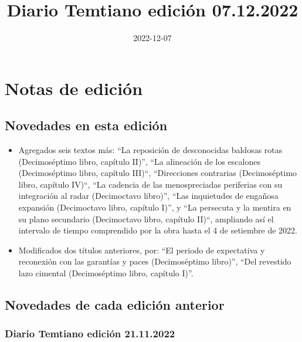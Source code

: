 \documentclass[
]{book}
\title{Diario Temtiano edición 07.12.2022}
\author{}
\date{\vspace{-2.5em}2022-12-07}
\begin{document}
\maketitle

{
\setcounter{tocdepth}{1}
\tableofcontents
}
\hypertarget{notas-de-ediciuxf3n}{%
\chapter*{Notas de edición}\label{notas-de-ediciuxf3n}}

\hypertarget{novedades-en-esta-ediciuxf3n}{%
\section*{Novedades en esta edición}\label{novedades-en-esta-ediciuxf3n}}

\begin{itemize}
\item
  Agregados seis textos más: ``La reposición de desconocidas baldosas rotas (Decimoséptimo libro, capítulo II)'', ``La alineación de los escalones (Decimoséptimo libro, capítulo III)``, ``Direcciones contrarias (Decimoséptimo libro, capítulo IV)``, ``La cadencia de las menospreciadas periferias con su integración al radar (Decimoctavo libro)'', ``Las inquietudes de engañosa expansión (Decimoctavo libro, capítulo I)'', y ``La persecuta y la mentira en su plano secundario (Decimoctavo libro, capítulo II)``, ampliando así el intervalo de tiempo comprendido por la obra hasta el 4 de setiembre de 2022.
\item
  Modificados dos títulos anteriores, por: ``El periodo de expectativa y reconexión con las garantías y paces (Decimoséptimo libro)'', ``Del revestido lazo cimental (Decimoséptimo libro, capítulo I)''.
\end{itemize}

\hypertarget{novedades-de-cada-ediciuxf3n-anterior}{%
\section*{Novedades de cada edición anterior}\label{novedades-de-cada-ediciuxf3n-anterior}}

\hypertarget{diario-temtiano-ediciuxf3n-21.11.2022}{%
\subsection*{Diario Temtiano edición 21.11.2022}\label{diario-temtiano-ediciuxf3n-21.11.2022}}
\end{document}
